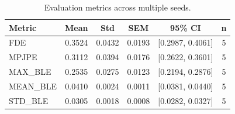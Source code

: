 \begin{table}[h]
\centering
\begin{tabular}{lccccc}
\hline
Metric & Mean & Std & SEM & 95\% CI & n \\
\hline
FDE & 0.3524 & 0.0432 & 0.0193 & [0.2987, 0.4061] & 5 \\
MPJPE & 0.3112 & 0.0394 & 0.0176 & [0.2622, 0.3601] & 5 \\
MAX_BLE & 0.2535 & 0.0275 & 0.0123 & [0.2194, 0.2876] & 5 \\
MEAN_BLE & 0.0410 & 0.0024 & 0.0011 & [0.0381, 0.0440] & 5 \\
STD_BLE & 0.0305 & 0.0018 & 0.0008 & [0.0282, 0.0327] & 5 \\
\hline
\end{tabular}
\caption{Evaluation metrics across multiple seeds.}
\label{tab:metrics}
\end{table}

